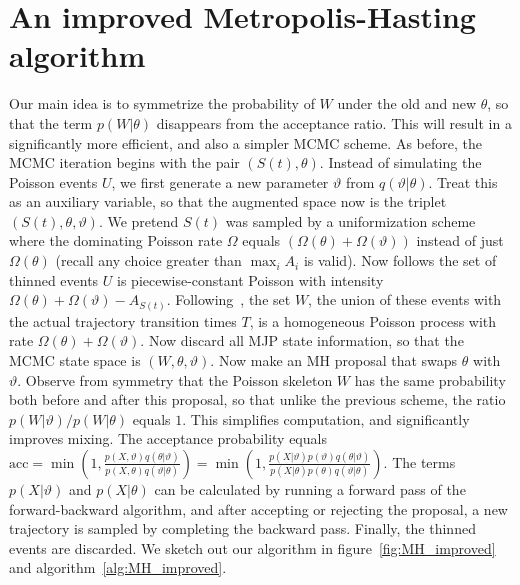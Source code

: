 
\section{An improved Metropolis-Hasting algorithm}
Our main idea is to symmetrize the probability of $W$ under the old and new 
$\theta$, so that the term
$p(W|\theta)$ disappears from the acceptance ratio. This will result
in a significantly more efficient, and also a simpler MCMC scheme.
As before, the MCMC iteration begins with the pair $(S(t), \theta)$. 
Instead of simulating the Poisson events $U$, we first generate a new 
parameter $\vartheta$ from $q(\vartheta|\theta)$. Treat this as an 
auxiliary variable, so that the augmented space now is the triplet 
$(S(t), \theta,\vartheta)$. We pretend $S(t)$ was sampled by a 
uniformization scheme where the dominating Poisson rate $\Omega$ equals 
$(\Omega(\theta) + \Omega(\vartheta))$ instead of just $\Omega(\theta)$ 
(recall any choice greater than $\max_i A_i$ is valid).
Now follows the set of thinned events $U$ is piecewise-constant
Poisson with intensity $\Omega(\theta) + \Omega(\vartheta) - 
A_{S(t)}$. Following~\cite{RaoTeh13}, the set $W$, the union of these events 
with the actual
trajectory transition times $T$, is a homogeneous Poisson process with 
rate $\Omega(\theta) + \Omega(\vartheta)$. Now discard all MJP 
state information, so that the MCMC state space is $(W, \theta, \vartheta)$.
Now make an MH proposal that swaps $\theta$ with $\vartheta$. 
Observe from
symmetry that the Poisson skeleton $W$ has the same probability both
before and after this proposal, so that unlike the previous scheme,
the ratio $p(W|\vartheta)/p(W|\theta)$ equals $1$.  This simplifies 
computation, and significantly improves mixing.
The acceptance probability 
equals
$ \text{acc} = 
  \min\left(1, \frac{p(X,\vartheta)q(\theta|\vartheta)}
   {p(X,\theta)q(\vartheta|\theta)}\right) = 
  \min\left(1, \frac{p(X|\vartheta)p(\vartheta)q(\theta|\vartheta)}
   {p(X|\theta)p(\theta)q(\vartheta|\theta)}\right).
   $
   The terms $p(X|\vartheta)$ and  $p(X|\theta)$ can be calculated by 
   running a forward pass of the forward-backward algorithm, and after
   accepting or rejecting the proposal, a new trajectory is sampled by
   completing the backward pass. Finally, the thinned events are
   discarded. We sketch out our algorithm in 
   figure~\ref{fig:MH_improved} and algorithm~\ref{alg:MH_improved}.
